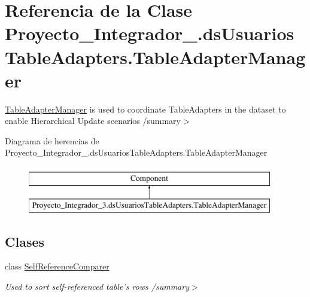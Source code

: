 \hypertarget{class_proyecto___integrador__3_1_1ds_usuarios_table_adapters_1_1_table_adapter_manager}{\section{Referencia de la Clase Proyecto\-\_\-\-Integrador\-\_.\-ds\-Usuarios\-Table\-Adapters.\-Table\-Adapter\-Manager}
\label{class_proyecto___integrador__3_1_1ds_usuarios_table_adapters_1_1_table_adapter_manager}
}


\hyperlink{class_proyecto___integrador__3_1_1ds_usuarios_table_adapters_1_1_table_adapter_manager}{Table\-Adapter\-Manager} is used to coordinate Table\-Adapters in the dataset to enable Hierarchical Update scenarios /summary$>$  


Diagrama de herencias de Proyecto\-\_\-\-Integrador\-\_.\-ds\-Usuarios\-Table\-Adapters.\-Table\-Adapter\-Manager\begin{figure}[H]
\begin{center}
\leavevmode
\includegraphics[height=2.000000cm]{dc/d91/class_proyecto___integrador__3_1_1ds_usuarios_table_adapters_1_1_table_adapter_manager}
\end{center}
\end{figure}
\subsection*{Clases}
\begin{DoxyCompactItemize}
\item 
class \hyperlink{class_proyecto___integrador__3_1_1ds_usuarios_table_adapters_1_1_table_adapter_manager_1_1_self_reference_comparer}{Self\-Reference\-Comparer}
\begin{DoxyCompactList}\small\item\em Used to sort self-\/referenced table's rows /summary$>$ \end{DoxyCompactList}\end{DoxyCompactItemize}
